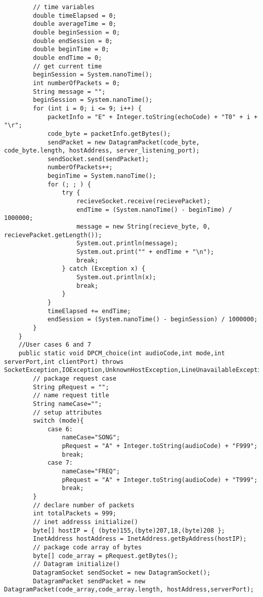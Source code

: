 \documentclass{article}
\begin{document}
\begin{lstlisting}
        // time variables
        double timeElapsed = 0;
        double averageTime = 0;
        double beginSession = 0;
        double endSession = 0;
        double beginTime = 0;
        double endTime = 0;
        // get current time
        beginSession = System.nanoTime();
        int numberOfPackets = 0;
        String message = "";
        beginSession = System.nanoTime();
        for (int i = 0; i <= 9; i++) {
            packetInfo = "E" + Integer.toString(echoCode) + "T0" + i + "\r";
            code_byte = packetInfo.getBytes();
            sendPacket = new DatagramPacket(code_byte, code_byte.length, hostAddress, server_listening_port);
            sendSocket.send(sendPacket);
            numberOfPackets++;
            beginTime = System.nanoTime();
            for (; ; ) {
                try {
                    recieveSocket.receive(recievePacket);
                    endTime = (System.nanoTime() - beginTime) / 1000000;
                    message = new String(recieve_byte, 0, recievePacket.getLength());
                    System.out.println(message);
                    System.out.print("" + endTime + "\n");
                    break;
                } catch (Exception x) {
                    System.out.println(x);
                    break;
                }
            }
            timeElapsed += endTime;
            endSession = (System.nanoTime() - beginSession) / 1000000;
        }
    }
    //User cases 6 and 7
    public static void DPCM_choice(int audioCode,int mode,int serverPort,int clientPort) throws SocketException,IOException,UnknownHostException,LineUnavailableException{
        // package request case
        String pRequest = "";
        // name request title
        String nameCase="";
        // setup attributes
        switch (mode){
            case 6:
                nameCase="SONG";
                pRequest = "A" + Integer.toString(audioCode) + "F999";
                break;
            case 7:
                nameCase="FREQ";
                pRequest = "A" + Integer.toString(audioCode) + "T999";
                break;
        }
        // declare number of packets
        int totalPackets = 999;
        // inet addresss initialize()
        byte[] hostIP = { (byte)155,(byte)207,18,(byte)208 };
        InetAddress hostAddress = InetAddress.getByAddress(hostIP);
        // package code array of bytes
        byte[] code_array = pRequest.getBytes();
        // Datagram initialize()
        DatagramSocket sendSocket = new DatagramSocket();
        DatagramPacket sendPacket = new DatagramPacket(code_array,code_array.length, hostAddress,serverPort);

\end{lstlisting}
\end{document}
